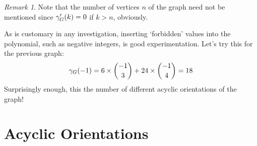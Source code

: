 \documentclass[svgnames]{article}
\theoremstyle{definition}
\theoremstyle{remark}
\newtheorem*{Remark*}{Remark}
\theoremstyle{underline}
\theoremstyle{underline}
\begin{document}
	\begin{Remark*}
		Note that the number of vertices $n$ of the graph need not be mentioned since $\gamma'_{G}\pqty{k} = 0$ if $k > n$, obviously.
	\end{Remark*}
	As is customary in any investigation, inserting `forbidden' values into the polynomial, such as negative integers, is good experimentation. Let's try this for the previous graph:
	\begin{gather*}
		\gamma_G\pqty{-1} = 6 \times \binom{-1}{3} + 24 \times \binom{-1}{4} = 18 
	\end{gather*}
	Surprisingly enough, this the number of different acyclic orientations of the graph!

	\section{Acyclic Orientations}
\end{document}
